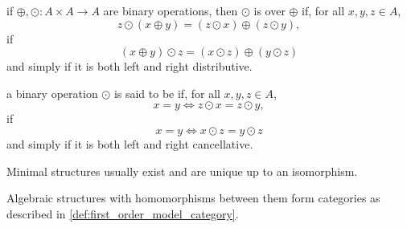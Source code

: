 \begin{definition}
\begin{defenum}
     if \( \oplus, \odot: A \times A \to A \) are binary operations, then \( \odot \) is  over \( \oplus \) if, for all \( x, y, z \in A \),
    \begin{equation*}
      z \odot (x \oplus y) = (z \odot x) \oplus (z \odot y),
    \end{equation*}
     if
    \begin{equation*}
      (x \oplus y) \odot z = (x \odot z) \oplus (y \odot z)
    \end{equation*}
    and simply  if it is both left and right distributive.

     a binary operation \( \odot \) is said to be  if, for all \( x, y, z \in A \),
    \begin{equation*}
      x = y \iff z \odot x = z \odot y,
    \end{equation*}
     if
    \begin{equation*}
      x = y \iff x \odot z = y \odot z
    \end{equation*}
    and simply  if it is both left and right cancellative.
  \end{defenum}

  Minimal structures usually exist and are unique up to an isomorphism.

  Algebraic structures with homomorphisms between them form categories as described in \cref{def:first_order_model_category}.
\end{definition}
